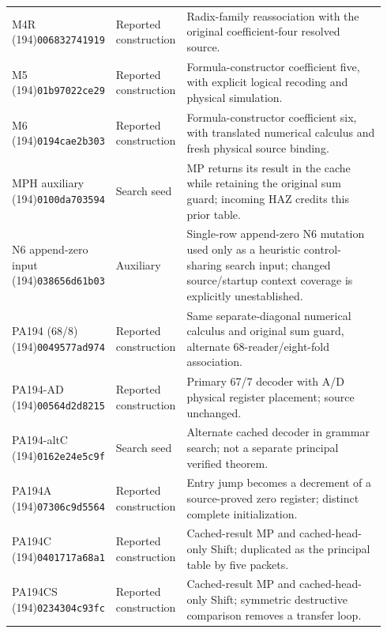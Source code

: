 \begin{longtable}{@{}p{0.24\linewidth}p{0.14\linewidth}p{0.56\linewidth}@{}}
M4R (194)\newline\texttt{006832741919} & Reported construction & Radix-family reassociation with the original coefficient-four resolved source.\\[4pt]
M5 (194)\newline\texttt{01b97022ce29} & Reported construction & Formula-constructor coefficient five, with explicit logical recoding and physical simulation.\\[4pt]
M6 (194)\newline\texttt{0194cae2b303} & Reported construction & Formula-constructor coefficient six, with translated numerical calculus and fresh physical source binding.\\[4pt]
MPH auxiliary (194)\newline\texttt{0100da703594} & Search seed & MP returns its result in the cache while retaining the original sum guard; incoming HAZ credits this prior table.\\[4pt]
N6 append-zero input (194)\newline\texttt{038656d61b03} & Auxiliary & Single-row append-zero N6 mutation used only as a heuristic control-sharing search input; changed source/startup context coverage is explicitly unestablished.\\[4pt]
PA194 (68/8) (194)\newline\texttt{0049577ad974} & Reported construction & Same separate-diagonal numerical calculus and original sum guard, alternate 68-reader/eight-fold association.\\[4pt]
PA194-AD (194)\newline\texttt{00564d2d8215} & Reported construction & Primary 67/7 decoder with A/D physical register placement; source unchanged.\\[4pt]
PA194-altC (194)\newline\texttt{0162e24e5c9f} & Search seed & Alternate cached decoder in grammar search; not a separate principal verified theorem.\\[4pt]
PA194A (194)\newline\texttt{07306c9d5564} & Reported construction & Entry jump becomes a decrement of a source-proved zero register; distinct complete initialization.\\[4pt]
PA194C (194)\newline\texttt{0401717a68a1} & Reported construction & Cached-result MP and cached-head-only Shift; duplicated as the principal table by five packets.\\[4pt]
PA194CS (194)\newline\texttt{0234304c93fc} & Reported construction & Cached-result MP and cached-head-only Shift; symmetric destructive comparison removes a transfer loop.\\[4pt]

\end{longtable}
